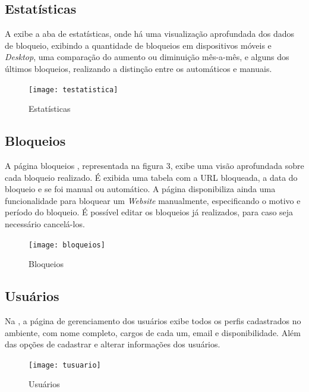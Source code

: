 \documentclass[
  a4paper,%
  12pt,%
  english,%
  brazilian,%
]{article}
\begin{document}
        \subsection*{Estatísticas}

        A  exibe a aba de estatísticas, onde há uma visualização aprofundada dos dados de bloqueio, exibindo a quantidade de bloqueios em dispositivos móveis e \textit{Desktop}, uma comparação do aumento ou diminuição mês-a-mês, e alguns dos últimos bloqueios, realizando a distinção entre os automáticos e manuais.

        \begin{figure}[H]
            \centering
            \caption{Estatísticas}%
            \label{fig:estatistica}
            \texttt{[image: testatistica]}
            \end{figure}


        \subsection*{Bloqueios}

        A página bloqueios , representada na figura 3, exibe uma visão aprofundada sobre cada bloqueio realizado. É exibida uma tabela com a URL bloqueada, a data do bloqueio e se foi manual ou automático. A página disponibiliza ainda uma funcionalidade para bloquear um \textit{Website} manualmente, especificando o motivo e período do bloqueio. É possível editar os bloqueios já realizados, para caso seja necessário cancelá-los.
        
        \begin{figure}[H]
            \centering
            \caption{Bloqueios}%
            \label{fig:Bloqueios}
            \texttt{[image: bloqueios]}
            \end{figure}

            \subsection*{Usuários}
            
            
            Na , a página de gerenciamento dos usuários exibe todos os perfis cadastrados no ambiente, com nome completo, cargos de cada um, email e disponibilidade. Além das opções de cadastrar e alterar informações dos usuários.
            \begin{figure}[H]
                \centering
                \caption{Usuários}%
                \label{fig:usu}
                \texttt{[image: tusuario]}
                \end{figure}
\end{document}
